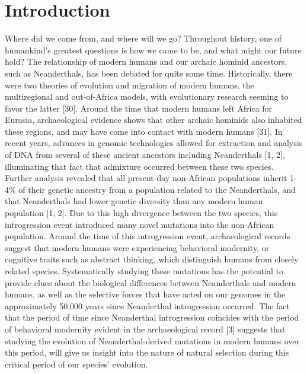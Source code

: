 
\chapter{Introduction}

Where did we come from, and where will we go? Throughout history, one of humankind's greatest questions is how we came to be, and what might our future hold? 
The relationship of modern humans and our archaic hominid ancestors, such as Neanderthals, has been debated for quite some time. Historically, there were two theories of evolution and migration of modern humans, the multiregional and out-of-Africa models, with evolutionary research seeming to favor the latter [30].  Around the time that modern humans left Africa for Eurasia, archaeological evidence shows that other archaic hominids also inhabited these regions, and may have come into contact with modern humans [31]. In recent years, advances in genomic technologies allowed for extraction and analysis of DNA from several of these ancient ancestors including Neanderthals [1, 2], illuminating that fact that admixture occurred between these two species. Further analysis revealed that all present-day non-African populations inherit 1-4\% of their genetic ancestry from a population related to the Neanderthals, and that Neanderthals had lower genetic diversity than any modern human population [1, 2].  Due to this high divergence between the two species, this introgression event introduced many novel mutations into the non-African population. Around the time of this introgression event, archaeological records suggest that modern humans were experiencing behavioral modernity, or cognitive traits such as abstract thinking, which distinguish humans from closely related species.
Systematically studying these mutations has the potential to provide clues about the biological differences between Neanderthals and modern humans, as well as the selective forces that have acted on our genomes in the approximately 50,000 years since Neanderthal introgression occurred. The fact that the period of time since Neanderthal introgression coincides with the period of behavioral modernity evident in the archaeological record [3] suggests that studying the evolution of Neanderthal-derived mutations in modern humans over this period, will give us insight into the nature of natural selection during this critical period of our species’ evolution. 

